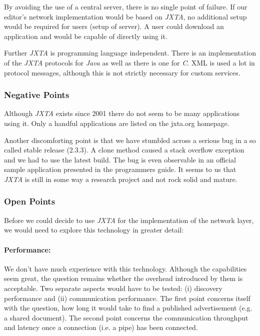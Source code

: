 By avoiding the use of a central server, there is no single point of failure. If our editor's network implementation would be based on \emph{JXTA}, no additional setup would be required for users (setup of server). A user could download an application and would be capable of directly using it.

Further \emph{JXTA} is programming language independent. There is an implementation of the \emph{JXTA} protocols for \emph{Java} as well as there is one for \emph{C}. XML is used a lot in protocol messages, although this is not strictly necessary for custom services.

\subsubsection{Negative Points}
Although \emph{JXTA} exists since 2001 there do not seem to be many applications using it. Only a handful applications are listed on the jxta.org homepage.

Another discomforting point is that we have stumbled across a serious bug in a so called stable release (2.3.3). A clone method caused a stack overflow exception and we had to use the latest build. The bug is even observable in an official sample application presented in the programmers guide. It seems to us that \emph{JXTA} is still in some way a research project and not rock solid and mature.

\subsubsection{Open Points}
Before we could decide to use \emph{JXTA} for the implementation of the network layer, we would need to explore this technology in greater detail:

\paragraph{Performance:} We don't have much experience with this technology. Although the capabilities seem great, the question remains whether the overhead introduced by them is acceptable. Two separate aspects would have to be tested: (i) discovery performance and (ii) communication performance. The first point concerns itself with the question, how long it would take to find a published advertisement (e.g. a shared document). The second point concerns the communication throughput and latency once a connection (i.e. a pipe) has been connected.


